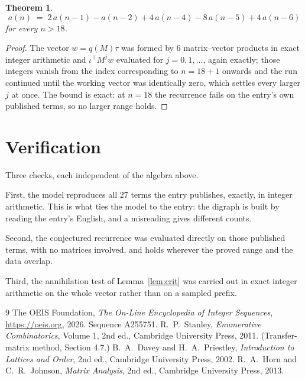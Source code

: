 \documentclass[11pt,a4paper]{article}
\theoremstyle{plain}
\newtheorem{theorem}{Theorem}
\theoremstyle{definition}
\begin{document}
\begin{theorem}
\[
a(n)\;=\;2\,a(n-1) - a(n-2) + 4\,a(n-4) - 8\,a(n-5) + 4\,a(n-6)
\]
for every $n>18$.
\end{theorem}

\begin{proof}
The vector $w=q(M)\tau$ was formed by $6$ matrix--vector products in exact integer
arithmetic and $\iota^{\!\top}M^{j}w$ evaluated for $j=0,1,\dots$, again exactly; those
integers vanish from the index corresponding to $n=18+1$ onwards and the run continued
until the working vector was identically zero, which settles every larger $j$ at once. The bound is exact: at $n=18$ the recurrence fails on the entry's own published terms, so no larger range holds.
\end{proof}

\section{Verification}

Three checks, each independent of the algebra above.

First, the model reproduces all $27$ terms the entry publishes, exactly, in integer
arithmetic. This is what ties the model to the entry: the digraph is built by reading the
entry's English, and a misreading gives different counts.

Second, the conjectured recurrence was evaluated directly on those published terms, with no
matrices involved, and holds wherever the proved range and the data overlap.

Third, the annihilation test of Lemma~\ref{lem:crit} was carried out in exact integer
arithmetic on the whole vector rather than on a sampled prefix.

\begin{thebibliography}{9}
 The OEIS Foundation, \emph{The On-Line Encyclopedia of Integer
Sequences}, \url{https://oeis.org}, 2026. Sequence A255751.
 R.~P.~Stanley, \emph{Enumerative Combinatorics}, Volume 1, 2nd ed.,
Cambridge University Press, 2011. (Transfer-matrix method, Section 4.7.)
 B.~A.~Davey and H.~A.~Priestley, \emph{Introduction to Lattices and
Order}, 2nd ed., Cambridge University Press, 2002.
 R.~A.~Horn and C.~R.~Johnson, \emph{Matrix Analysis}, 2nd ed., Cambridge
University Press, 2013.
\end{thebibliography}
\end{document}
